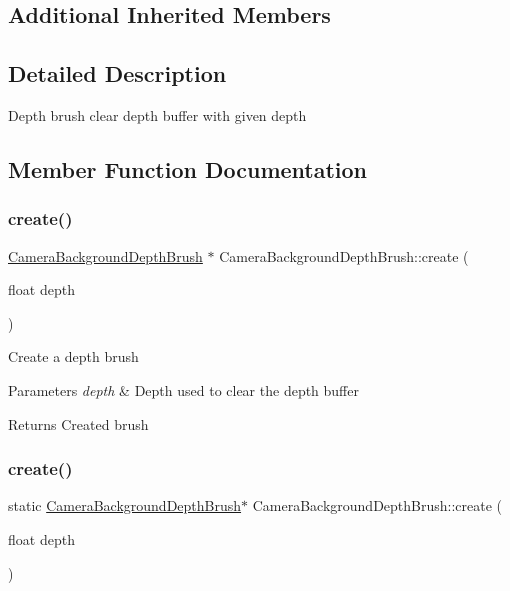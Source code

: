 \subsection*{Additional Inherited Members}


\subsection{Detailed Description}
Depth brush clear depth buffer with given depth 

\subsection{Member Function Documentation}
\mbox{\label{classCameraBackgroundDepthBrush_a4dcbc6c0ce0041ebd4b756da61772340}} 
\subsubsection{\texorpdfstring{create()}{create()}\hspace{0.1cm}{\footnotesize\ttfamily [1/2]}}
{\footnotesize\ttfamily \hyperlink{classCameraBackgroundDepthBrush}{Camera\+Background\+Depth\+Brush} $\ast$ Camera\+Background\+Depth\+Brush\+::create (\begin{DoxyParamCaption}\item[{float}]{depth }\end{DoxyParamCaption})\hspace{0.3cm}{\ttfamily [static]}}

Create a depth brush 
\begin{DoxyParams}{Parameters}
{\em depth} & Depth used to clear the depth buffer \\
\hline
\end{DoxyParams}
\begin{DoxyReturn}{Returns}
Created brush 
\end{DoxyReturn}
\mbox{\label{classCameraBackgroundDepthBrush_a98c7ee137600abb4dd07387bade6687e}} 
\subsubsection{\texorpdfstring{create()}{create()}\hspace{0.1cm}{\footnotesize\ttfamily [2/2]}}
{\footnotesize\ttfamily static \hyperlink{classCameraBackgroundDepthBrush}{Camera\+Background\+Depth\+Brush}$\ast$ Camera\+Background\+Depth\+Brush\+::create (\begin{DoxyParamCaption}\item[{float}]{depth }\end{DoxyParamCaption})\hspace{0.3cm}{\ttfamily [static]}}


